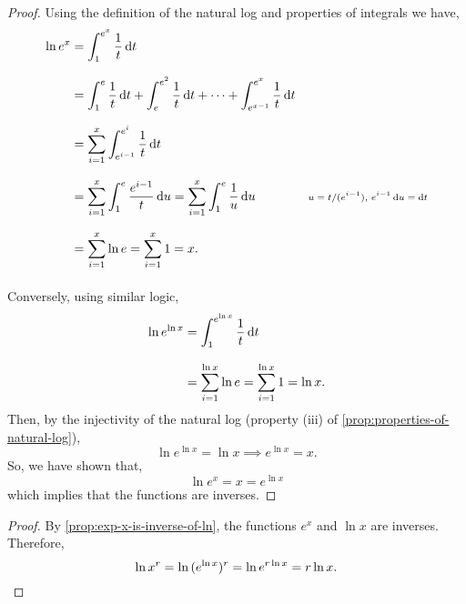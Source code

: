 \documentclass[../MathsNotesBase.tex]{subfiles}
\begin{document}
{	\bigskip\bigskip
	\begin{proof}
		Using the definition of the natural log and properties of integrals we have,
		\begin{align*}
		\ln{e^x} &= \int_1^{e^x} \frac{1}{t} \dif t \\[8pt]
		  		 &= \int_1^{e} \frac{1}{t} \dif t + \int_e^{e^2} \frac{1}{t} \dif t + \cdots + \int_{e^{x-1}}^{e^x} \frac{1}{t} \dif t &\sidecomment{} \\[8pt]
		  		 &= \sum_{i=1}^x \int_{e^{i-1}}^{e^i} \frac{1}{t} \dif t \\[8pt]
		  		 &= \sum_{i=1}^x \int_{1}^e \frac{e^{i-1}}{t} \dif u = \sum_{i=1}^x \int_{1}^e \frac{1}{u} \dif u &\sidecomment{${ u = t/(e^{i-1}),\, e^{i-1}\dif u = \dif t }$}\\[8pt]
		  		 &= \sum_{i=1}^x \ln{e} = \sum_{i=1}^x 1 = x. \\[8pt]
		\end{align*}
		Conversely, using similar logic,
		\begin{align*}
		&& \ln{e^{\ln{x}}} &= \int_1^{e^{\ln{x}}} \frac{1}{t} \dif t \\[8pt]
		&&  &= \sum_{i=1}^{\ln{x}} \ln{e} = \sum_{i=1}^{\ln{x}} 1 = \ln{x}. &\sidecomment{} \\
		\end{align*}
		Then, by the injectivity of the natural log (property (iii) of \autoref{prop:properties-of-natural-log}),
		\[ \ln{e^{\ln{x}}} = \ln{x} \implies e^{\ln{x}} = x. \]
		So, we have shown that,
		\[ \ln{e^x} = x = e^{\ln{x}} \]
		which implies that the functions are inverses.
	\end{proof}

	
	\bigskip\bigskip
	\begin{proof}
		By \autoref{prop:exp-x-is-inverse-of-ln}, the functions ${ e^x }$ and ${ \ln{x} }$ are inverses. Therefore,
		\[ \ln{x^r} = \ln{(e^{\ln{x}})^r} = \ln{e^{r\ln{x}}} = r\ln{x}. \qedhere \]
	\end{proof}
	

}
\end{document}
